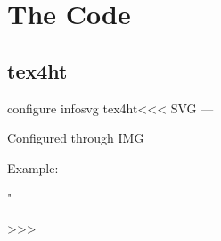 \chapter{The Code}

\section{tex4ht}

\<configure infosvg tex4ht\><<<
SVG
---

 Configured through IMG

  Example:
      {}
      {}
      {" }
      {}
      {}
>>>




 
 
\endinput


